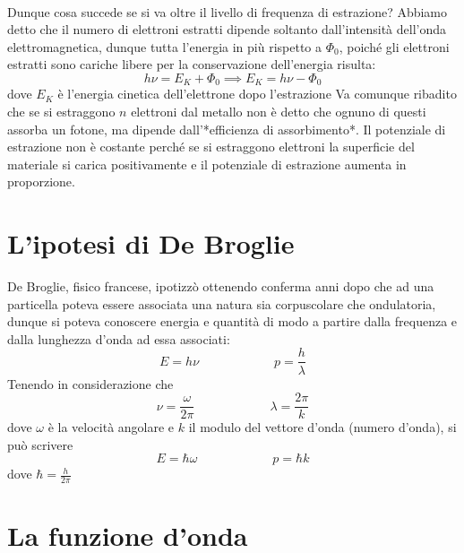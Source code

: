 \documentclass{book}
\begin{document}
    \paragraph{}
        Dunque cosa succede se si va oltre il livello di frequenza di estrazione? Abbiamo detto che il numero di elettroni estratti dipende soltanto dall'intensità dell'onda elettromagnetica, dunque tutta l'energia in più rispetto a $\Phi_{0}$, poiché gli elettroni estratti sono cariche libere per la conservazione dell'energia risulta:
        $$h \nu = E_{K}+\Phi_{0} \implies E_{K} = h \nu - \Phi_{0}$$
        dove $E_{K}$ è l'energia cinetica dell'elettrone dopo l'estrazione
        Va comunque ribadito che se si estraggono $n$ elettroni dal metallo non è detto che ognuno di questi assorba un fotone, ma dipende dall'*efficienza di assorbimento*.
        Il potenziale di estrazione non è costante perché se si estraggono elettroni la superficie del materiale si carica positivamente e il potenziale di estrazione aumenta in proporzione.
    \section{L'ipotesi di De Broglie}
        De Broglie, fisico francese, ipotizzò ottenendo conferma anni dopo che ad una particella poteva essere associata una natura sia corpuscolare che ondulatoria, dunque si poteva conoscere energia e quantità di modo a partire dalla frequenza e dalla lunghezza d'onda ad essa associati:
        $$E = h \nu \qquad \qquad \qquad p = \frac{h}{\lambda}$$
        Tenendo in considerazione che
        $$\nu = \frac{\omega}{2 \pi} \qquad \qquad \qquad \lambda = \frac{2\pi}{k}$$
        dove $\omega $ è la velocità angolare e $k$ il modulo del vettore d'onda (numero d'onda), si può scrivere
        $$E = \hbar \omega \qquad \qquad \qquad p = \hbar k$$
        dove $\hbar = \frac{h}{2\pi}$
    \section{La funzione d'onda}
\end{document}
